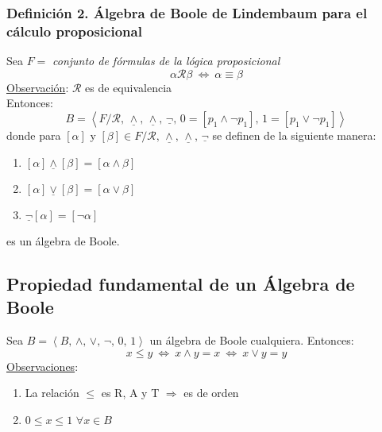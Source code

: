 \documentclass{article}
\newcommand{\comma}{,\,}                                %
\newcommand{\relates}{\mathcal{R}}                      %
\newcommand{\Leftrightarrows}{\: \Leftrightarrow \:}    %
\begin{document}
\newpage
\subsubsection*{Definición 2. Álgebra de Boole de Lindembaum para el cálculo proposicional}
Sea $F =$ \emph{conjunto de fórmulas de la lógica proposicional}
\begin{equation*}
    \alpha \relates \beta \Leftrightarrows \alpha \equiv \beta
\end{equation*}
\underline{Observación}: $\relates$ es de equivalencia
\\Entonces:
\begin{equation*}
    B = \left < F/\relates \comma \underline{\wedge} \comma \underline{\wedge} \comma \underline{\neg} \comma 0 = [p_1 \wedge \neg p_1] \comma 1 = [p_1 \vee \neg p_1] \right >
\end{equation*}
donde para $[\alpha]$ y $[\beta] \in F/\relates \comma \underline{\wedge} \comma \underline{\wedge} \comma \underline{\neg}$ se definen de la siguiente manera:
\begin{enumerate}
    \item $[\alpha] \underline{\wedge} [\beta] = [\alpha \wedge \beta]$
    \item $[\alpha] \underline{\vee} [\beta] = [\alpha \vee \beta]$
    \item $\underline{\neg}[\alpha] = [\neg \alpha]$ 
\end{enumerate}
es un álgebra de Boole.

\subsection{Propiedad fundamental de un Álgebra de Boole}
Sea $B = \left< B \comma \wedge \comma \vee \comma \neg \comma 0 \comma 1 \right >$ un álgebra de Boole cualquiera. Entonces:
\begin{equation*}
    x \leq y \Leftrightarrows x \wedge y = x \Leftrightarrows x \vee y = y
\end{equation*}
\underline{Observaciones}:
\begin{enumerate}
    \item La relación $\leq$ es R, A y T $\Rightarrow$ es de orden
    \item $0 \leq x \leq 1$ $\forall x \in B$
\end{enumerate}
\end{document}
